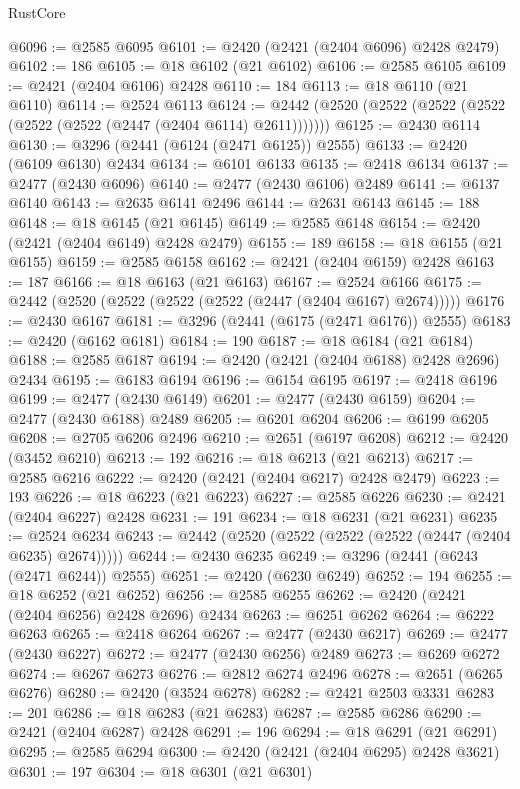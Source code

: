\begin{lexlean}{RustCore}
\begin{coremodule}
@6096 := @2585 @6095
@6101 := @2420 (@2421 (@2404 @6096) @2428 @2479)
@6102 := 186
@6105 := @18 @6102 (@21 @6102)
@6106 := @2585 @6105
@6109 := @2421 (@2404 @6106) @2428
@6110 := 184
@6113 := @18 @6110 (@21 @6110)
@6114 := @2524 @6113
@6124 := @2442 (@2520 (@2522 (@2522 (@2522 (@2522 (@2522 (@2447 (@2404 @6114) @2611)))))))
@6125 := @2430 @6114
@6130 := @3296 (@2441 (@6124 (@2471 @6125)) @2555)
@6133 := @2420 (@6109 @6130) @2434
@6134 := @6101 @6133
@6135 := @2418 @6134
@6137 := @2477 (@2430 @6096)
@6140 := @2477 (@2430 @6106) @2489
@6141 := @6137 @6140
@6143 := @2635 @6141 @2496
@6144 := @2631 @6143
@6145 := 188
@6148 := @18 @6145 (@21 @6145)
@6149 := @2585 @6148
@6154 := @2420 (@2421 (@2404 @6149) @2428 @2479)
@6155 := 189
@6158 := @18 @6155 (@21 @6155)
@6159 := @2585 @6158
@6162 := @2421 (@2404 @6159) @2428
@6163 := 187
@6166 := @18 @6163 (@21 @6163)
@6167 := @2524 @6166
@6175 := @2442 (@2520 (@2522 (@2522 (@2522 (@2447 (@2404 @6167) @2674)))))
@6176 := @2430 @6167
@6181 := @3296 (@2441 (@6175 (@2471 @6176)) @2555)
@6183 := @2420 (@6162 @6181)
@6184 := 190
@6187 := @18 @6184 (@21 @6184)
@6188 := @2585 @6187
@6194 := @2420 (@2421 (@2404 @6188) @2428 @2696) @2434
@6195 := @6183 @6194
@6196 := @6154 @6195
@6197 := @2418 @6196
@6199 := @2477 (@2430 @6149)
@6201 := @2477 (@2430 @6159)
@6204 := @2477 (@2430 @6188) @2489
@6205 := @6201 @6204
@6206 := @6199 @6205
@6208 := @2705 @6206 @2496
@6210 := @2651 (@6197 @6208)
@6212 := @2420 (@3452 @6210)
@6213 := 192
@6216 := @18 @6213 (@21 @6213)
@6217 := @2585 @6216
@6222 := @2420 (@2421 (@2404 @6217) @2428 @2479)
@6223 := 193
@6226 := @18 @6223 (@21 @6223)
@6227 := @2585 @6226
@6230 := @2421 (@2404 @6227) @2428
@6231 := 191
@6234 := @18 @6231 (@21 @6231)
@6235 := @2524 @6234
@6243 := @2442 (@2520 (@2522 (@2522 (@2522 (@2447 (@2404 @6235) @2674)))))
@6244 := @2430 @6235
@6249 := @3296 (@2441 (@6243 (@2471 @6244)) @2555)
@6251 := @2420 (@6230 @6249)
@6252 := 194
@6255 := @18 @6252 (@21 @6252)
@6256 := @2585 @6255
@6262 := @2420 (@2421 (@2404 @6256) @2428 @2696) @2434
@6263 := @6251 @6262
@6264 := @6222 @6263
@6265 := @2418 @6264
@6267 := @2477 (@2430 @6217)
@6269 := @2477 (@2430 @6227)
@6272 := @2477 (@2430 @6256) @2489
@6273 := @6269 @6272
@6274 := @6267 @6273
@6276 := @2812 @6274 @2496
@6278 := @2651 (@6265 @6276)
@6280 := @2420 (@3524 @6278)
@6282 := @2421 @2503 @3331
@6283 := 201
@6286 := @18 @6283 (@21 @6283)
@6287 := @2585 @6286
@6290 := @2421 (@2404 @6287) @2428
@6291 := 196
@6294 := @18 @6291 (@21 @6291)
@6295 := @2585 @6294
@6300 := @2420 (@2421 (@2404 @6295) @2428 @3621)
@6301 := 197
@6304 := @18 @6301 (@21 @6301)

\end{coremodule}
\end{lexlean}
